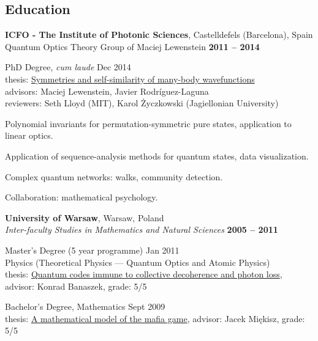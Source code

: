 \documentclass[margin,line]{resume}
\begin{document}
\begin{resume}
\vspace{3mm}

    \section{\mysidestyle Education}
    
    {\bf ICFO - The Institute of Photonic Sciences},  Castelldefels (Barcelona), Spain \\%
    Quantum Optics Theory Group of Maciej Lewenstein \hfill {\bf 2011 -- 2014}\\
   \begin{list2}
        \vspace*{-4mm}
        \item PhD Degree, \emph{cum laude} {\hfill Dec 2014}\\
        thesis: \href{http://arxiv.org/abs/1412.6796}{Symmetries and self-similarity of many-body wavefunctions}\\
        advisors: Maciej Lewenstein, Javier Rodríguez-Laguna\\
        reviewers: Seth Lloyd (MIT), Karol Życzkowski (Jagiellonian University)\\
        \item Polynomial invariants for permutation-symmetric pure states, application to linear optics.
        \item Application of sequence-analysis methods for quantum states, data visualization.
        \item Complex quantum networks: walks, community detection.
        \item Collaboration: mathematical psychology.
    \end{list2}

    {\bf University of Warsaw}, Warsaw, Poland \\
    {\sl Inter-faculty Studies in Mathematics and Natural Sciences} \hfill {\bf 2005 -- 2011}\\
    \begin{list2}
      \vspace*{-4mm}
      \item Master's Degree  (5 year programme) {\hfill Jan 2011}\\
      Physics (Theoretical Physics --- Quantum Optics and Atomic Physics)\\
      thesis: \href{http://migdal.wikidot.com/en:collective-decoherence}{Quantum codes immune to collective decoherence and photon loss},\\
      advisor: Konrad Banaszek, grade: 5/5
      \item Bachelor's Degree, Mathematics \hfill Sept 2009\\
      thesis: \href{http://migdal.wikidot.com/en:mafia}{A mathematical model of the mafia game}, advisor: Jacek Miękisz, grade: 5/5
    \end{list2}


\end{resume}
\end{document}
